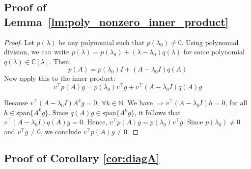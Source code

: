 \subsection{Proof of Lemma~\ref{lm:poly_nonzero_inner_product}}
\begin{proof}
Let \( p(\lambda) \) be any polynomial such that \( p(\lambda_0) \neq 0 \).  
Using polynomial division, we can write \(p(\lambda) = p(\lambda_0) + (\lambda - \lambda_0) q(\lambda)\) for some polynomial \( q(\lambda) \in \mathbb{C}[\lambda] \). Then:
\[
p(A) = p(\lambda_0) I + (A - \lambda_0 I) q(A)
\]
Now apply this to the inner product:
\[
v^\top p(A) g = p(\lambda_0) v^\top g + v^\top (A - \lambda_0 I) q(A) g
\]

Because \(v^\top (A - \lambda_0 I) A^k g = 0,\ \forall k \in \mathbb{N}\). We have \(\Rightarrow v^\top (A - \lambda_0 I) h = 0\), for all \(h \in \text{span}\{A^k g\}\).
Since \( q(A) g \in \text{span}\{A^k g\} \), it follows that \(v^\top (A - \lambda_0 I) q(A) g = 0\).
Hence, \(v^\top p(A) g = p(\lambda_0) v^\top g\).
Since \( p(\lambda_0) \neq 0 \) and \( v^\top g \neq 0 \), we conclude \(v^\top p(A) g \neq 0\).
\end{proof}


\subsection{Proof of Corollary \ref{cor:diagA}}

